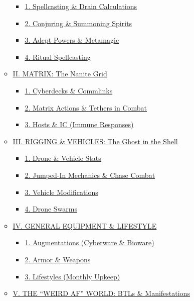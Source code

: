 \documentclass[
  oneside]{article}
\providecommand{\tightlist}{%
  \setlength{\itemsep}{0pt}\setlength{\parskip}{0pt}}
\begin{document}
\begin{multicols}{2}
\begin{itemize}
\begin{itemize}
    \begin{itemize}
    \tightlist
    \item
      \protect\hyperlink{1-spellcasting--drain-calculations}{1.
      Spellcasting \& Drain Calculations}
    \item
      \protect\hyperlink{2-conjuring--summoning-spirits}{2.
      Conjuring \& Summoning Spirits}
    \item
      \protect\hyperlink{3-adept-powers--metamagic}{3.
      Adept Powers \& Metamagic}
    \item
      \protect\hyperlink{4-ritual-spellcasting}{4.
      Ritual Spellcasting}
    \end{itemize}
  \item
    \protect\hyperlink{ii-matrix-the-nanite-grid}{II.
    MATRIX: The Nanite Grid}

    \begin{itemize}
    \tightlist
    \item
      \protect\hyperlink{1-cyberdecks--commlinks}{1.
      Cyberdecks \& Commlinks}
    \item
      \protect\hyperlink{2-matrix-actions--tethers-in-combat}{2.
      Matrix Actions \& Tethers in Combat}
    \item
      \protect\hyperlink{3-hosts--ic-immune-responses}{3.
      Hosts \& IC (Immune Responses)}
    \end{itemize}
  \item
    \protect\hyperlink{iii-rigging--vehicles-the-ghost-in-the-shell}{III.
    RIGGING \& VEHICLES: The Ghost in the Shell}

    \begin{itemize}
    \tightlist
    \item
      \protect\hyperlink{1-drone--vehicle-stats}{1.
      Drone \& Vehicle Stats}
    \item
      \protect\hyperlink{2-jumped-in-mechanics--chase-combat}{2.
      Jumped-In Mechanics \& Chase Combat}
    \item
      \protect\hyperlink{3-vehicle-modifications}{3.
      Vehicle Modifications}
    \item
      \protect\hyperlink{4-drone-swarms}{4. Drone
      Swarms}
    \end{itemize}
  \item
    \protect\hyperlink{iv-general-equipment--lifestyle}{IV.
    GENERAL EQUIPMENT \& LIFESTYLE}

    \begin{itemize}
    \tightlist
    \item
      \protect\hyperlink{1-augmentations-cyberware--bioware}{1.
      Augmentations (Cyberware \& Bioware)}
    \item
      \protect\hyperlink{2-armor--weapons}{2.
      Armor \& Weapons}
    \item
      \protect\hyperlink{3-lifestyles-monthly-upkeep}{3.
      Lifestyles (Monthly Upkeep)}
    \end{itemize}
  \item
    \protect\hyperlink{v-the-weird-af-world-btls--manifestations}{V.
    THE ``WEIRD AF'' WORLD: BTLs \&
    Manifestations}


\end{itemize}
\end{itemize}
\end{multicols}
\end{document}
